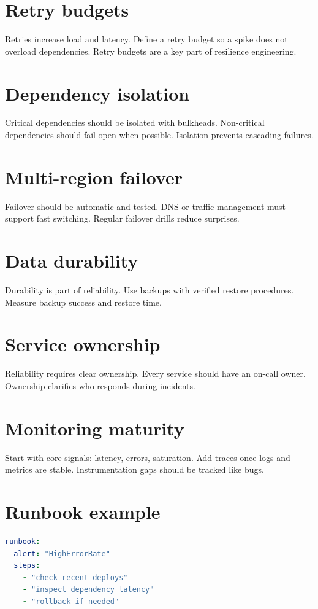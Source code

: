 \section{Retry budgets}
Retries increase load and latency.
Define a retry budget so a spike does not overload dependencies.
Retry budgets are a key part of resilience engineering.

\section{Dependency isolation}
Critical dependencies should be isolated with bulkheads.
Non-critical dependencies should fail open when possible.
Isolation prevents cascading failures.

\section{Multi-region failover}
Failover should be automatic and tested.
DNS or traffic management must support fast switching.
Regular failover drills reduce surprises.

\section{Data durability}
Durability is part of reliability.
Use backups with verified restore procedures.
Measure backup success and restore time.

\section{Service ownership}
Reliability requires clear ownership.
Every service should have an on-call owner.
Ownership clarifies who responds during incidents.

\section{Monitoring maturity}
Start with core signals: latency, errors, saturation.
Add traces once logs and metrics are stable.
Instrumentation gaps should be tracked like bugs.

\section{Runbook example}
\begin{lstlisting}[language=YAML]
runbook:
  alert: "HighErrorRate"
  steps:
    - "check recent deploys"
    - "inspect dependency latency"
    - "rollback if needed"
\end{lstlisting}

